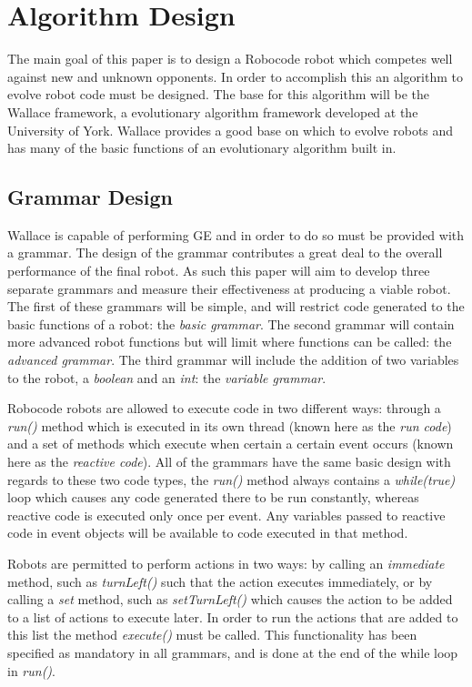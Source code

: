 \documentclass[a4paper, 12pt]{article}
\begin{document}
\section{Algorithm Design}

The main goal of this paper is to design a Robocode robot which competes well against new and unknown opponents. In order to accomplish this an algorithm to evolve robot code must be designed. The base for this algorithm will be the Wallace framework, a evolutionary algorithm framework developed at the University of York. Wallace provides a good base on which to evolve robots and has many of the basic functions of an evolutionary algorithm built in. 

\subsection{Grammar Design}
Wallace is capable of performing GE and in order to do so must be provided with a grammar.  The design of the grammar contributes a great deal to the overall performance of the final robot. As such this paper will aim to develop three separate grammars and measure their effectiveness at producing a viable robot. The first of these grammars will be simple, and will restrict code generated to the basic functions of a robot: the \textit{basic grammar}. The second grammar will contain more advanced robot functions but will limit where functions can be called: the \textit{advanced grammar}. The third grammar will include the addition of two variables to the robot, a \textit{boolean} and an \textit{int}: the \textit{variable grammar}.

Robocode robots are allowed to execute code in two different ways: through a \textit{run()} method which is executed in its own thread (known here as the \textit{run code}) and a set of methods which execute when certain a certain event occurs (known here as the \textit{reactive code}). All of the grammars have the same basic design with regards to these two code types, the \textit{run()} method always contains a \textit{while(true)} loop which causes any code generated there to be run constantly, whereas reactive code is executed only once per event. Any variables passed to reactive code in event objects will be available to code executed in that method.

Robots are permitted to perform actions in two ways: by calling an \textit{immediate} method, such as \textit{turnLeft()} such that the action executes immediately, or by calling a \textit{set} method, such as \textit{setTurnLeft()} which causes the action to be added to a list of actions to execute later. In order to run the actions that are added to this list the method \textit{execute()} must be called. This functionality has been specified as mandatory in all grammars, and is done at the end of the while loop in \textit{run()}.
\end{document}
